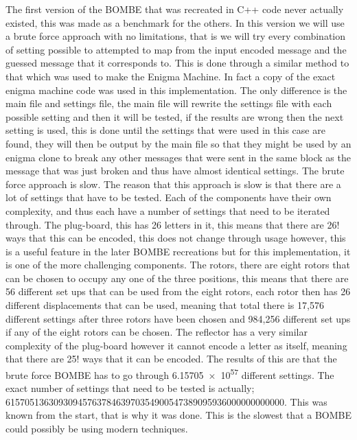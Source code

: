 \documentclass[12pt,a4paper]{article}
\begin{document}
The first version of the BOMBE that was recreated in C++ code never actually existed, this was made as a benchmark for the others. In this version we will use a brute force approach with no limitations, that is we will try every combination of setting possible to attempted to map from the input encoded message and the guessed message that it corresponds to. This is done through a similar method to that which was used to make the Enigma Machine. In fact a copy of the exact enigma machine code was used in this implementation. The only difference is the main file and settings file, the main file will rewrite the settings file with each possible setting and then it will be tested, if the results are wrong then the next setting is used, this is done until the settings that were used in this case are found, they will then be output by the main file so that they might be used by an enigma clone to break any other messages that were sent in the same block as the message that was just broken and thus have almost identical settings. The brute force approach is slow. The reason that this approach is slow is that there are a lot of settings that have to be tested. Each of the components have their own complexity, and thus each have a number of settings that need to be iterated through. The plug-board, this has 26 letters in it, this means that there are 26! ways that this can be encoded, this does not change through usage however, this is a useful feature in the later BOMBE recreations but for this implementation, it is one of the more challenging components. The rotors, there are eight rotors that can be chosen to occupy any one of the three positions, this means that there are 56 different set ups that can be used from the eight rotors, each rotor then has 26 different displacements that can be used, meaning that total there is 17,576 different settings after three rotors have been chosen and 984,256 different set ups if any of the eight rotors can be chosen. The reflector has a very similar complexity of the plug-board however it cannot encode a letter as itself, meaning that there are 25! ways that it can be encoded. The results of this are that the brute force BOMBE has to go through \num{6.15705e57} different settings. The exact number of settings that need to be tested is actually; \num{6157051363093094576378463970354900547389095936000000000000}. This was known from the start, that is why it was done. This is the slowest that a BOMBE could possibly be using modern techniques. \\
\end{document}
